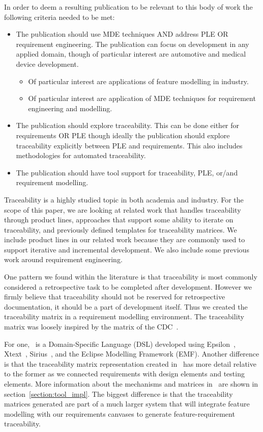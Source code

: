 In order to deem a resulting publication to be relevant to this body of work the following criteria needed to be met:
\begin{itemize}
	\item The publication should use \ac{MDE} techniques AND address \ac{PLE} OR requirement engineering. The publication can focus on development in any applied domain, though of particular interest are automotive and medical device development. 
	\begin{itemize}
		\item Of particular interest are applications of feature modelling in industry. 
		\item Of particular interest are application of \ac{MDE} techniques for requirement engineering and modelling.
	\end{itemize}
	\item The publication should explore traceability. This can be done either for requirements OR \ac{PLE} though ideally the publication should explore traceability explicitly between \ac{PLE} and requirements. This also includes methodologies for automated traceability.
	\item The publication should have tool support for traceability, \ac{PLE}, or/and requirement modelling. 
\end{itemize}


Traceability is a highly studied topic in both academia and industry. For the scope of this paper, we are looking at related work that handles traceability through product lines, approaches that support some ability to iterate on traceability, and previously defined templates for traceability matrices. We include product lines in our related work because they are commonly used to support iterative and incremental development. We also include some previous work around requirement engineering.




One pattern we found within the literature is that traceability is most commonly considered a retrospective task to be completed after development. However we firmly believe that traceability should not be reserved for retrospective documentation, it should be a part of development itself. Thus we created the traceability matrix in a requirement modelling environment. The traceability matrix was loosely inspired by the matrix of the CDC~\cite{tmat_cdc}.

For one, \tool\ is a Domain-Specific Language (DSL) developed using Epsilon~\cite{kolovos2010epsilon}, Xtext~\cite{eysholdt2010xtext}, Sirius~\cite{viyovic2014sirius}, and the Eclipse Modelling Framework (EMF). Another difference is that the traceability matrix representation created in \tool\ has more detail relative to the former as we connected requirements with design elements and testing elements. More information about the mechanisms and matrices in \tool\ are shown in section~\ref{section:tool_impl}. The biggest difference is that the traceability matrices generated are part of a much larger system that will integrate feature modelling with our requirements canvases to generate feature-requirement traceability. 


